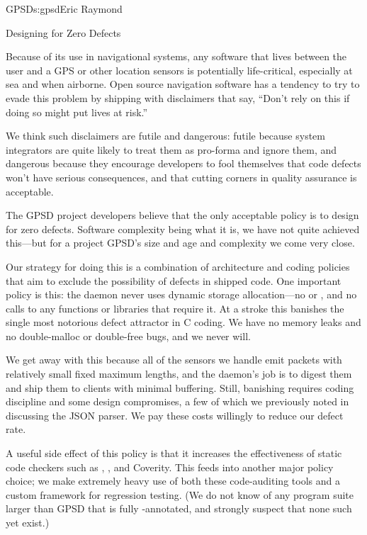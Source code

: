 \begin{aosachapter}{GPSD}{s:gpsd}{Eric Raymond}
\begin{aosasect1}{Designing for Zero Defects}

Because of its use in navigational systems, any software that lives
between the user and a GPS or other location sensors is potentially
life-critical, especially at sea and when airborne.  Open source
navigation software has a tendency to try to evade this problem by
shipping with disclaimers that say, ``Don't rely on this if doing so
might put lives at risk.''

We think such disclaimers are futile and dangerous: futile because
system integrators are quite likely to treat them as pro-forma and
ignore them, and dangerous because they encourage developers to fool
themselves that code defects won't have serious consequences, and that
cutting corners in quality assurance is acceptable.

The GPSD project developers believe that the only acceptable policy is
to design for zero defects. Software complexity being what it is, we
have not quite achieved this---but for a project GPSD's size and age
and complexity we come very close.

Our strategy for doing this is a combination of architecture and
coding policies that aim to exclude the possibility of defects in
shipped code.  One important policy is this: the  daemon
never uses dynamic storage allocation---no  or
, and no calls to any functions or libraries that require
it.  At a stroke this banishes the single most notorious defect
attractor in C coding.  We have no memory leaks and no double-malloc
or double-free bugs, and we never will.

We get away with this because all of the sensors we handle emit
packets with relatively small fixed maximum lengths, and the daemon's
job is to digest them and ship them to clients with minimal buffering.
Still, banishing  requires coding discipline and some
design compromises, a few of which we previously noted in discussing
the JSON parser. We pay these costs willingly to reduce our defect
rate.

A useful side effect of this policy is that it increases the
effectiveness of static code checkers such as ,
, and Coverity.  This feeds into another major policy
choice; we make extremely heavy use of both these code-auditing tools
and a custom framework for regression testing.  (We do not know of any
program suite larger than GPSD that is fully -annotated,
and strongly suspect that none such yet exist.)


\end{aosasect1}
\end{aosachapter}
